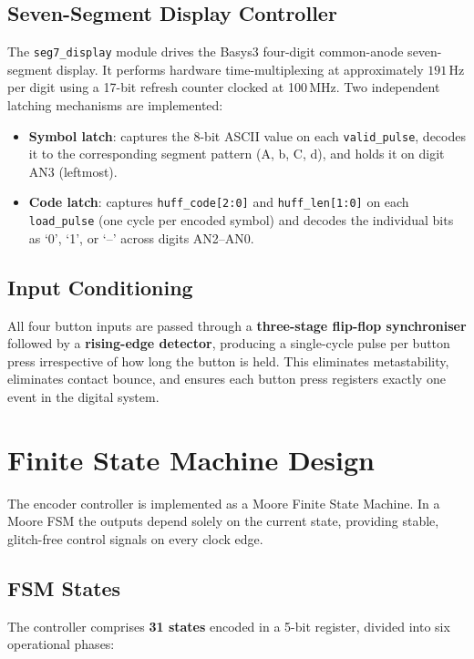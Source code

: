 \documentclass[12pt,a4paper]{article}
\begin{document}
\subsection{Seven-Segment Display Controller}
The \texttt{seg7\_display} module drives the Basys3 four-digit common-anode
seven-segment display. It performs hardware time-multiplexing at approximately
$191\,\text{Hz}$ per digit using a 17-bit refresh counter clocked at 100\,MHz.
Two independent latching mechanisms are implemented:
\begin{itemize}
  \item \textbf{Symbol latch}: captures the 8-bit ASCII value on each \texttt{valid\_pulse},
        decodes it to the corresponding segment pattern (A, b, C, d), and holds it on
        digit AN3 (leftmost).
  \item \textbf{Code latch}: captures \texttt{huff\_code[2:0]} and
        \texttt{huff\_len[1:0]} on each \texttt{load\_pulse} (one cycle per encoded
        symbol) and decodes the individual bits as `0', `1', or `--' across digits
        AN2--AN0.
\end{itemize}

\subsection{Input Conditioning}
All four button inputs are passed through a \textbf{three-stage flip-flop synchroniser}
followed by a \textbf{rising-edge detector}, producing a single-cycle pulse per button
press irrespective of how long the button is held. This eliminates metastability,
eliminates contact bounce, and ensures each button press registers exactly one event
in the digital system.

\section{Finite State Machine Design}

The encoder controller is implemented as a Moore Finite State Machine. In a Moore FSM
the outputs depend solely on the current state, providing stable, glitch-free control
signals on every clock edge.

\subsection{FSM States}
The controller comprises \textbf{31 states} encoded in a 5-bit register, divided into
six operational phases:
\end{document}
